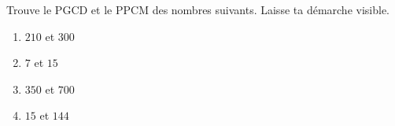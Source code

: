 %
%
    Trouve le PGCD et le PPCM des nombres suivants. Laisse ta démarche visible.
    \begin{enumerate}[cols=4]
        \item $210$ et $300$
        \item $7 $ et $ 15$
        \item $350$ et $700$
        \item $15$ et $144$
    \end{enumerate}
